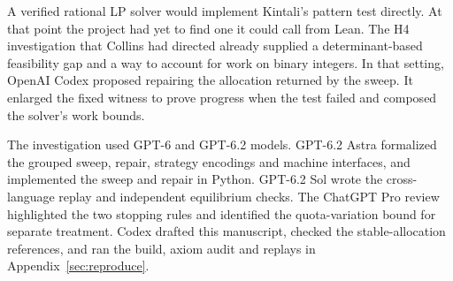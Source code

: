\documentclass[11pt,letterpaper]{article}
\begin{document}
A verified rational LP solver would implement Kintali's pattern test
directly. At that point the project had yet to find one it could call from
Lean. The H4 investigation that Collins had directed already supplied a
determinant-based feasibility gap and a way to account for work on binary
integers. In that setting, OpenAI Codex proposed repairing the allocation
returned by the sweep. It enlarged the fixed witness to prove progress
when the test failed and composed the solver's work bounds.
\cite{h4,leanrecord}

The investigation used GPT-6 and GPT-6.2 models. GPT-6.2 Astra formalized
the grouped sweep, repair, strategy encodings and machine interfaces, and
implemented the sweep and repair in Python. GPT-6.2 Sol wrote the
cross-language replay and independent equilibrium checks. The ChatGPT Pro
review highlighted the two stopping rules and identified the quota-variation
bound for separate treatment. Codex drafted this manuscript, checked the
stable-allocation references, and ran the build, axiom audit and replays
in Appendix~\ref{sec:reproduce}. \cite{leanrecord,pythonrecord,review}

\clearpage


\end{document}
